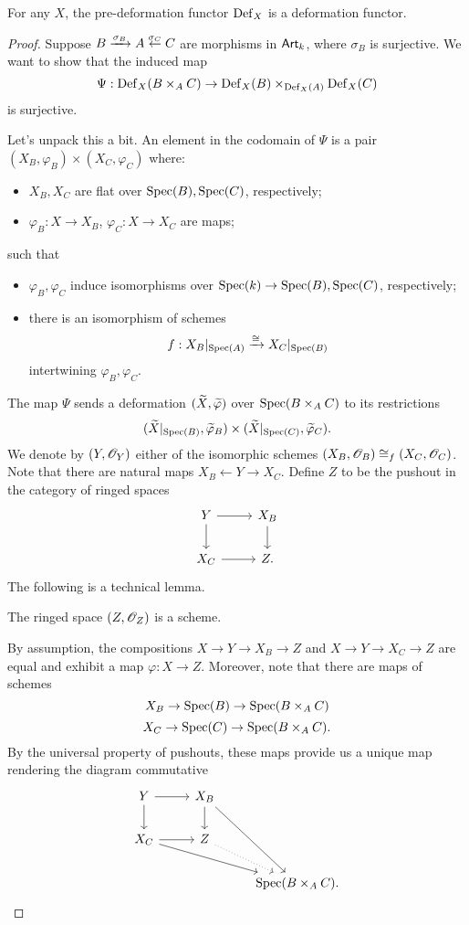 \documentclass[11pt]{amsart}
\def\Spec{{\rm Spec}}
\begin{document}
\begin{prop}
For any $X$, the pre-deformation functor ${\rm Def}_X$ is a deformation functor. 
\end{prop}
\begin{proof}
Suppose $B \xto{\sigma_B} A \overset{\sigma_C}{\leftarrow} C$ are morphisms in $\Art_k$, where $\sigma_B$ is surjective. 
We want to show that the induced map
\[
\Psi : \Def_X (B \times_A C) \to \Def_X(B) \times_{\Def_X(A)} \Def_X(C)
\]
is surjective. 

Let's unpack this a bit. 
An element in the codomain of $\Psi$ is a pair $(X_B, \varphi_B) \times (X_C,\varphi_C)$ where:
\begin{itemize}
\item $X_B,X_C$ are flat over $\Spec(B), \Spec(C)$, respectively;
\item $\varphi_B : X \to X_B$, $\varphi_C : X \to X_C$ are maps;
\end{itemize}
such that 
\begin{itemize}
\item $\varphi_B,\varphi_C$ induce isomorphisms over $\Spec(k) \to \Spec(B), \Spec(C)$, respectively; 
\item there is an isomorphism of schemes
\[
f : X_B |_{\Spec(A)} \xto{\cong} X_C |_{\Spec(B)}
\] 
intertwining $\varphi_B,\varphi_C$. 
\end{itemize} 

The map $\Psi$ sends a deformation $(\Tilde{X}, \Tilde{\varphi})$ over $\Spec(B \times_A C)$ to its restrictions
\[
(\Tilde{X} |_{\Spec(B)}, \Tilde{\varphi}_B) \times (\Tilde{X} |_{\Spec(C)}, \Tilde{\varphi}_C) .
\]
We denote by $(Y, \sO_Y)$ either of the isomorphic schemes $(X_B, \sO_B) \cong_f (X_C, \sO_C)$. 
Note that there are natural maps $X_B \leftarrow Y \to X_C$. 
Define $Z$ to be the pushout in the category of ringed spaces
\[
\begin{tikzcd}
Y \ar[r] \ar[d] & X_B \ar[d] \\ X_C \ar[r] & Z .
\end{tikzcd}
\] 
The following is a technical lemma.
\begin{lem} The ringed space $(Z,\sO_Z)$ is a scheme.
\end{lem}

By assumption, the compositions $X \to Y \to X_B \to Z$ and $X \to Y \to X_C \to Z$ are equal and exhibit a map $\varphi : X \to Z$. 
Moreover, note that there are maps of schemes
\[
X_B \to \Spec(B) \to \Spec(B \times_A C)
\]
\[
X_C \to \Spec(C) \to \Spec(B \times_A C) .
\] 
By the universal property of pushouts, these maps provide us a unique map rendering the diagram commutative
\[
\begin{tikzcd}
Y \ar[r] \ar[d] & X_B \ar[d] \ar[ddr] & \\ 
X_C \ar[r] \ar[drr] & Z \ar[dr, dotted] & \\ 
& & \Spec(B \times_A C) .
\end{tikzcd}
\] 


\end{proof}
\end{document}

